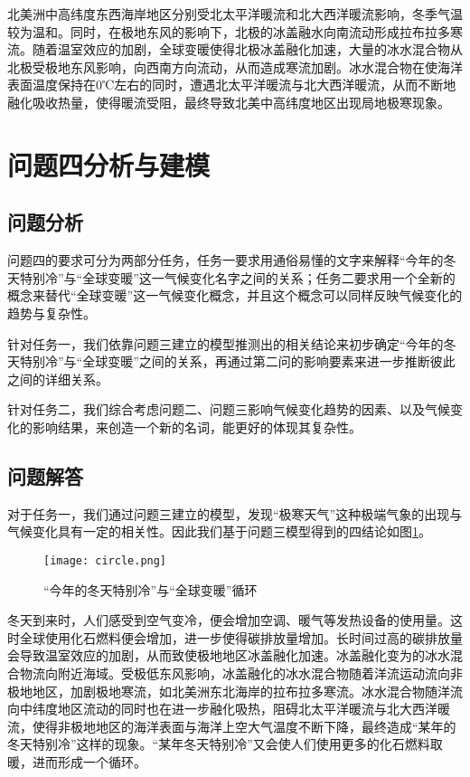 \documentclass[bwprint]{gmcmthesis}
\begin{document}
北美洲中高纬度东西海岸地区分别受北太平洋暖流和北大西洋暖流影响，冬季气温较为温和。同时，在极地东风的影响下，北极的冰盖融水向南流动形成拉布拉多寒流。随着温室效应的加剧，全球变暖使得北极冰盖融化加速，大量的冰水混合物从北极受极地东风影响，向西南方向流动，从而造成寒流加剧。冰水混合物在使海洋表面温度保持在0℃左右的同时，遭遇北太平洋暖流与北大西洋暖流，从而不断地融化吸收热量，使得暖流受阻\cite{St2009Climate}，最终导致北美中高纬度地区出现局地极寒现象\cite{Nicholls1999Cognitive}。

\section{问题四分析与建模}

\subsection{问题分析}

问题四的要求可分为两部分任务，任务一要求用通俗易懂的文字来解释“今年的冬天特别冷”与“全球变暖”这一气候变化名字之间的关系；任务二要求用一个全新的概念来替代“全球变暖”这一气候变化概念，并且这个概念可以同样反映气候变化的趋势与复杂性。

针对任务一，我们依靠问题三建立的模型推测出的相关结论来初步确定“今年的冬天特别冷”与“全球变暖”之间的关系，再通过第二问的影响要素来进一步推断彼此之间的详细关系。

针对任务二，我们综合考虑问题二、问题三影响气候变化趋势的因素\cite{Palmer2004REPRESENTING}、以及气候变化的影响结果，来创造一个新的名词\cite{St2009Climate}，能更好的体现其复杂性\cite{Hastenrath1991Climate}。

\subsection{问题解答}

对于任务一，我们通过问题三建立的模型，发现“极寒天气”这种极端气象的出现与气候变化具有一定的相关性。因此我们基于问题三模型得到的四结论如图\ref{circle}。

\begin{figure}[!h]
\centering
\texttt{[image: circle.png]}
\caption{“今年的冬天特别冷”与“全球变暖”循环}\label{circle}
\end{figure}

冬天到来时，人们感受到空气变冷，便会增加空调、暖气等发热设备的使用量。这时全球使用化石燃料便会增加，进一步使得碳排放量增加。长时间过高的碳排放量会导致温室效应的加剧，从而致使极地地区冰盖融化加速。冰盖融化变为的冰水混合物流向附近海域。受极低东风影响，冰盖融化的冰水混合物随着洋流运动流向非极地地区，加剧极地寒流，如北美洲东北海岸的拉布拉多寒流。冰水混合物随洋流向中纬度地区流动的同时也在进一步融化吸热，阻碍北太平洋暖流与北大西洋暖流，使得非极地地区的海洋表面与海洋上空大气温度不断下降，最终造成“某年的冬天特别冷”这样的现象。“某年冬天特别冷”又会使人们使用更多的化石燃料取暖，进而形成一个循环\cite{Hastenrath1991Climate}。
\end{document}
